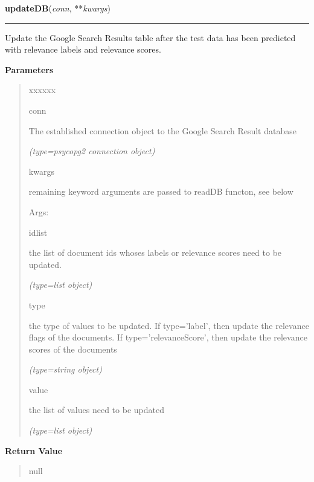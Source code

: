\hspace{.8\funcindent}\begin{boxedminipage}{\funcwidth}

    \raggedright \textbf{updateDB}(\textit{conn}, **\textit{kwargs})

    \vspace{-1.5ex}

    \rule{\textwidth}{0.5\fboxrule}
\setlength{\parskip}{2ex}
    Update the Google Search Results table after the test data has been 
    predicted with relevance labels and relevance scores.

\setlength{\parskip}{1ex}
      \textbf{Parameters}
      \vspace{-1ex}

      \begin{quote}
        \begin{Ventry}{xxxxxx}

          \item[conn]

          The established connection object to the Google Search Result 
          database

            {\it (type=psycopg2 connection object)}

          \item[kwargs]

          remaining keyword arguments are passed to readDB functon, see 
          below

          Args:

          \item[idlist]

          the list of document ids whoses labels or relevance scores need 
          to be updated.

            {\it (type=list object)}

          \item[type]

          the type of values to be updated. If type='label', then update 
          the relevance flags of the documents.     If 
          type='relevanceScore', then update the relevance scores of the 
          documents

            {\it (type=string object)}

          \item[value]

          the list of values need to be updated

            {\it (type=list object)}

        \end{Ventry}

      \end{quote}

      \textbf{Return Value}
    \vspace{-1ex}

      \begin{quote}
      null

      \end{quote}

    \end{boxedminipage}


